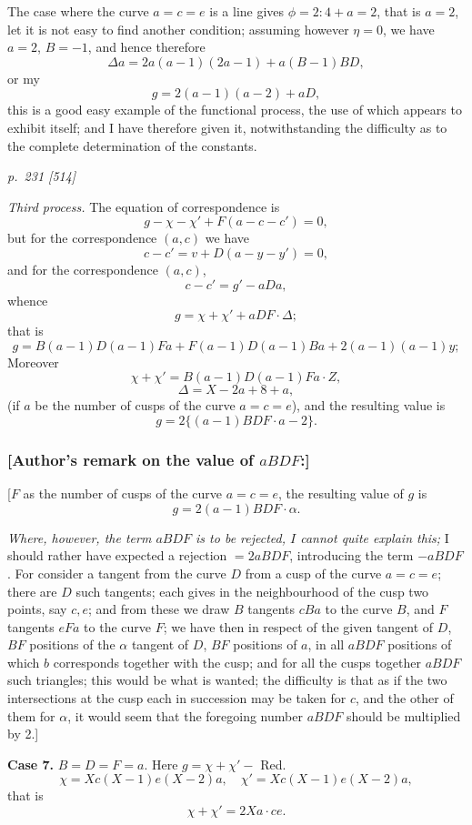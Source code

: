 \documentclass[11pt,a4paper]{book}
\begin{document}
The case where the curve $a=c=e$ is a line gives $\phi=2:4+a=2$, that is $a=2$,
let it is not easy to find another condition; assuming however $\eta=0$, we have $a=2$,
$B=-1$, and hence therefore
\[
\Delta a=2a(a-1)(2a-1)+a(B-1)BD,
\]
or my
\[
g=2(a-1)(a-2)+aD,
\]
this is a good easy example of the functional process, the use of which appears to
exhibit itself; and I have therefore given it, notwithstanding the difficulty as to the
complete determination of the constants.

\clearpage

\bigskip
\textit{p.~231 [514]}
\smallskip

\textit{Third process.}  The equation of correspondence is
\[
g-\chi-\chi'+F(a-c-c')=0,
\]
but for the correspondence $(a, c)$ we have
\[
c-c'=v+D(a-y-y')=0,
\]
and for the correspondence $(a, c)$,
\[
c-c'=g'-aDa,
\]
whence
\[
g=\chi+\chi'+aDF\cdot \Delta;
\]
that is
\[
g=B(a-1)D(a-1)Fa+F(a-1)D(a-1)Ba+2(a-1)(a-1)y;
\]
Moreover
\[
\chi+\chi'=B(a-1)D(a-1)Fa\cdot Z,
\]
\[
\Delta=X-2a+8+a,
\]
(if $a$ be the number of cusps of the curve $a=c=e$), and the resulting value is
\[
g=2\{(a-1)BDF\cdot a-2\}.
\]

\subsubsection*{[Author's remark on the value of $aBDF$:]}

[$F$ as the number of cusps of the curve $a=c=e$, the resulting value of $g$ is
\[
g=2(a-1)BDF\cdot \alpha.
\]

\textit{Where, however, the term $aBDF$ is to be rejected, $I$ cannot quite explain this;}
I should rather have expected a rejection $=2aBDF$, introducing the term $-aBDF$.
For consider a tangent from the curve $D$ from a cusp of the curve $a=c=e$; there are
$D$ such tangents; each gives in the neighbourhood of the cusp two points, say $c, e$;
and from these we draw $B$ tangents $cBa$ to the curve $B$, and $F$ tangents $eFa$ to the
curve $F$; we have then in respect of the given tangent of $D$, $BF$ positions of the
$\alpha$ tangent of $D$, $BF$ positions of $a$, in all $aBDF$ positions of which $b$ corresponds together with the cusp; and
for all the cusps together $aBDF$ such triangles; this would be what is wanted; the
difficulty is that as if the two intersections at the cusp each in succession may be
taken for $c$, and the other of them for $\alpha$, it would seem that the foregoing number
$aBDF$ should be multiplied by 2.]

\textbf{Case 7.}  $B=D=F=a$.  Here $g=\chi+\chi'-$ Red.
\[
\chi=Xc(X-1)e(X-2)a, \quad \chi'=Xc(X-1)e(X-2)a,
\]
that is
\[
\chi+\chi'=2Xa\cdot ce.
\]
\end{document}
